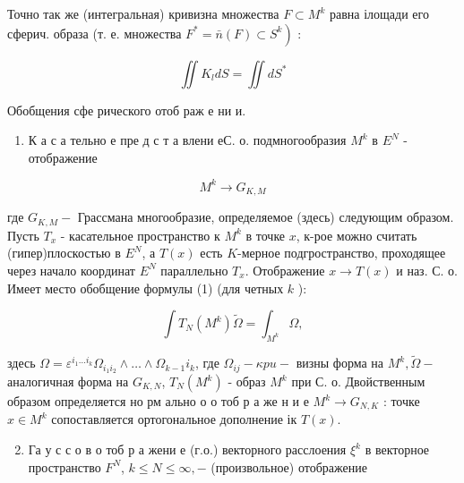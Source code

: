 \documentclass[10pt]{article}
\begin{document}
Точно так же (интегральная) кривизна множества $F \subset M^{k}$ равна ілощади его сферич. образа (т. е. множества $\left.F^{*}=\bar{n}(F) \subset S^{k}\right)$ :



\[

\iint K_{l} d S=\iint d S^{*}

\]



Обобщения сфе рического отоб раж е ни и.



\begin{enumerate}

  \item К а с а тельно е пре д с т а влени еС. о. подмногообразия $M^{k}$ в $E^{N}$ - отображение

\end{enumerate}



\[

M^{k} \longrightarrow G_{K, M}

\]



где $G_{K, M}-$ Грассмана многообразие, определяемое (здесь) следующим образом. Пусть $T_{x}$ - касательное пространство к $M^{k}$ в точке $x$, к-рое можно считать (гипер)плоскостью в $E^{N}$, а $T(x)$ есть $K$-мерное подгространство, проходящее через начало координат $E^{N}$ параллельно $T_{x}$. Отображение $x \rightarrow T(x)$ и наз. С. о. Имеет место обобщение формулы (1) (для четных $k$ ):



\[

\int T_{N}\left(M^{k}\right) \tilde{\Omega}=\int_{M^{k}} \Omega,

\]



здесь $\Omega=\varepsilon^{i_{1} \ldots i_{k}} \Omega_{i_{1} i_{2}} \wedge \ldots \wedge \Omega_{k-1} i_{k}$, где $\Omega_{i j}-\kappa p u-$ визны форма на $M^{k}, \tilde{\Omega}-$ аналогичная форма на $G_{K, N}$, $T_{N}\left(M^{k}\right)$ - образ $M^{k}$ при С. о. Двойственным образом определяется но рм ально о о тоб р а же н и е $M^{k} \rightarrow G_{N, K}$ : точке $x \in M^{k}$ сопоставляется ортогональное дополнение ік $T(x)$.



\begin{enumerate}

  \setcounter{enumi}{1}

  \item Га у с с о в о тоб р а жени е (г.о.) векторного расслоения $\xi^{k}$ в векторное пространство $F^{N}$, $k \leqslant N \leqslant \infty,-$ (произвольное) отображение

\end{enumerate}
\end{document}
